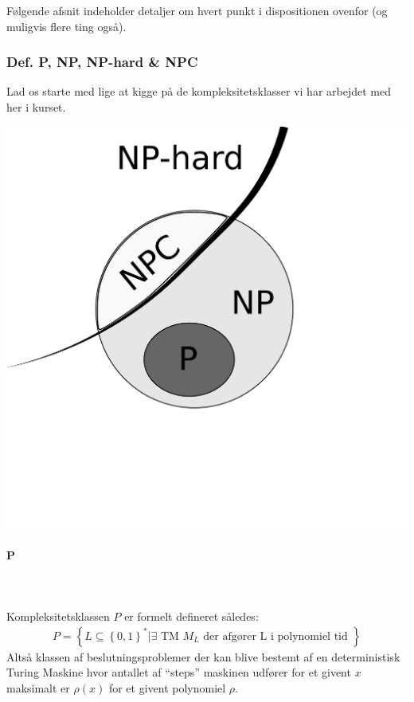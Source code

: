 Følgende afsnit indeholder detaljer om hvert punkt i dispositionen ovenfor (og muligvis flere ting også).

\subsubsection{Def. P, NP, NP-hard \& NPC}

Lad os starte med lige at kigge på de kompleksitetsklasser vi har arbejdet med her i kurset.
\begin{center}
 \includegraphics[bb=0 0 400 400,scale=0.3]{img/PNPNPC.png}
\end{center}


\paragraph{P}
~\\
~\\
Kompleksitetsklassen $P$ er formelt defineret således:
\begin{align*}
 P = \left\lbrace L \subseteq \left\lbrace 0,1 \right\rbrace^* | \exists \text{ TM } M_L \text{ der afgører L i polynomiel tid } \right\rbrace
\end{align*}
Altså klassen af beslutningsproblemer der kan blive bestemt af en deterministisk Turing Maskine hvor antallet af ``steps'' maskinen udfører for et givent $x$ maksimalt er $\rho(x)$ for et givent polynomiel $\rho$.\\
 
